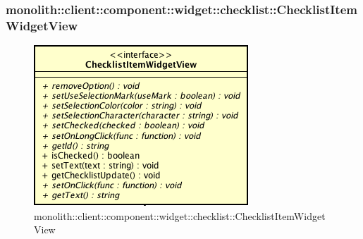 \subsubsection{monolith::client::component::widget::checklist::ChecklistItemWidgetView}

\label{monolith::client::component::widget::checklist::ChecklistItemWidgetView}
\begin{figure}[H]
	\centering
	\includegraphics[scale=0.5]{Sezioni/SottosezioniST/img/ChecklistItemWidgetView.png}
	\caption{monolith::client::component::widget::checklist::ChecklistItemWidgetView}
\end{figure}

